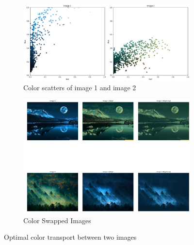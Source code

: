 \begin{figure}[!htpb]
	\begin{subfigure}[b]{0.45\textwidth}
		\centering
		\captionsetup{format = hang}
		\includegraphics[height = 0.5\textwidth,width = 1\textwidth]{Exercise4/Report/ot_scatterplot}
		\caption{Color scatters of image 1 and image 2  }\label{fig:ot_scatterplot}
	\end{subfigure}%
	\begin{subfigure}[b]{0.45\textwidth}
		\centering
		\captionsetup{width=0.9\linewidth, format = hang}
		\includegraphics[height = 0.8\textwidth, width = 1\textwidth]{Exercise4/Report/ot_output}
		\caption{Color Swapped Images}\label{fig:ot_out}
	\end{subfigure}%
	\captionsetup{format = hang}
	\caption{Optimal color transport between two images}
	\label{fig:ot}
\end{figure}
